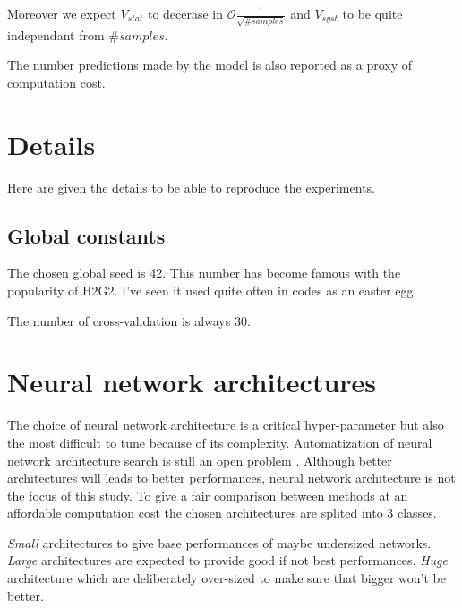 Moreover we expect $V_{stat}$ to decerase in $\mathcal O \frac{1}{\sqrt{\#samples}}$ and $V_{syst}$ to be quite independant from $\#samples$.

The number predictions made by the model is also reported as a proxy of computation cost.















\section{Details} %
\label{sec:details}

Here are given the details to be able to reproduce the experiments.




\subsection{Global constants} %
\label{sub:global_constants}

The chosen global seed is 42.
This number has become famous with the popularity of H2G2\needcite.
I've seen it used quite often in codes as an easter egg.


The number of cross-validation is always 30.







\section{Neural network architectures} %
\label{sec:neural_network_architectures}


The choice of neural network architecture is a critical hyper-parameter but also the most difficult to tune because of its complexity.
Automatization of neural network architecture search is still an open problem \needcite.
Although better architectures will leads to better performances, neural network architecture is not the focus of this study.
To give a fair comparison between methods at an affordable computation cost the chosen architectures are splited into 3 classes.

\emph{Small} architectures to give base performances of maybe undersized networks.
\emph{Large} architectures are expected to provide good if not best performances.
\emph{Huge} architecture which are deliberately over-sized to make sure that bigger won't be better.


